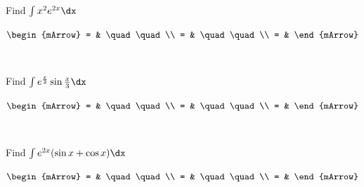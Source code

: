\clearpage\noindent%
\begin{mtask}[resume]
   \task \begin{exercise} Find $\int x^2 e^{2x} \dx$
           \begin{envSolution}
             $\begin{mArrow}
                 = & \quad \quad              \\
		   		 = & \quad \quad              \\
				 = &  
              \end{mArrow}$
            \begin{shortsolution}  
			     $\quad \quad$
			\end{shortsolution}				 
           \end{envSolution}
         \end{exercise}
     
   \task \begin{exercise} Find $\int e^{\frac{x}{2}} \sin{\frac{x}{3}} \dx$
           \begin{envSolution}
             $\begin{mArrow}
                 = & \quad \quad              \\
		   		 = & \quad \quad              \\
				 = &  
              \end{mArrow}$
            \begin{shortsolution}  
			     $\quad \quad$
			\end{shortsolution}				 
           \end{envSolution}
         \end{exercise}

\end{mtask}

\clearpage\noindent%
\begin{mtask}[resume]
   \task \begin{exercise} Find $\int e^{2x}(\sin{x} + \cos{x}) \dx$
           \begin{envSolution}
             $\begin{mArrow}
                 = & \quad \quad              \\
		   		 = & \quad \quad              \\
				 = &  
              \end{mArrow}$
            \begin{shortsolution}  
			     $\quad \quad$
			\end{shortsolution}				 
           \end{envSolution}
         \end{exercise}
     
\end{mtask}
\clearpage\noindent%



